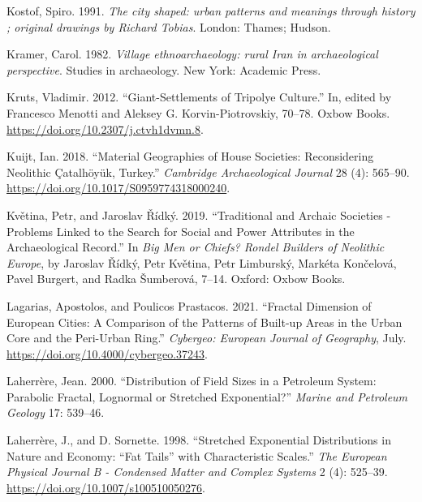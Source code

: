 \documentclass[
  12pt,
  a4paper, twoside]{book}
\newlength{\cslhangindent}
\newlength{\cslentryspacingunit} %
\newenvironment{CSLReferences}[2] %
 {%
  \setlength{\parindent}{0pt}
  \ifodd #1
  \let\oldpar\par
  \def\par{\hangindent=\cslhangindent\oldpar}
  \fi
  \setlength{\parskip}{#2\cslentryspacingunit}
 }%
 {}
\begin{document}
\begin{CSLReferences}{1}{0}
\leavevmode{}%
Kostof, Spiro. 1991. \emph{The city shaped: urban patterns and meanings through history ; original drawings by Richard Tobias}. London: Thames; Hudson.

\leavevmode{}%
Kramer, Carol. 1982. \emph{Village ethnoarchaeology: rural Iran in archaeological perspective}. Studies in archaeology. New York: Academic Press.

\leavevmode{}%
Kruts, Vladimir. 2012. {``Giant-Settlements of Tripolye Culture.''} In, edited by Francesco Menotti and Aleksey G. Korvin-Piotrovskiy, 70--78. Oxbow Books. \url{https://doi.org/10.2307/j.ctvh1dvmn.8}.

\leavevmode{}%
Kuijt, Ian. 2018. {``Material Geographies of House Societies: Reconsidering Neolithic Çatalhöyük, Turkey.''} \emph{Cambridge Archaeological Journal} 28 (4): 565--90. \url{https://doi.org/10.1017/S0959774318000240}.

\leavevmode{}%
Květina, Petr, and Jaroslav Řídký. 2019. {``Traditional and Archaic Societies - Problems Linked to the Search for Social and Power Attributes in the Archaeological Record.''} In \emph{Big Men or Chiefs? {Rondel} Builders of Neolithic {Europe}}, by Jaroslav Řídký, Petr Květina, Petr Limburský, Markéta Končelová, Pavel Burgert, and Radka Šumberová, 7--14. {Oxford}: {Oxbow Books}.

\leavevmode{}%
Lagarias, Apostolos, and Poulicos Prastacos. 2021. {``Fractal Dimension of European Cities: A Comparison of the Patterns of Built-up Areas in the Urban Core and the Peri-Urban Ring.''} \emph{Cybergeo: European Journal of Geography}, July. \url{https://doi.org/10.4000/cybergeo.37243}.

\leavevmode{}%
Laherrère, Jean. 2000. {``Distribution of Field Sizes in a Petroleum System: Parabolic Fractal, Lognormal or Stretched Exponential?''} \emph{Marine and Petroleum Geology} 17: 539--46.

\leavevmode{}%
Laherrère, J., and D. Sornette. 1998. {``Stretched Exponential Distributions in Nature and Economy: {``}Fat Tails{''} with Characteristic Scales.''} \emph{The European Physical Journal B - Condensed Matter and Complex Systems} 2 (4): 525--39. \url{https://doi.org/10.1007/s100510050276}.


\end{CSLReferences}
\end{document}
